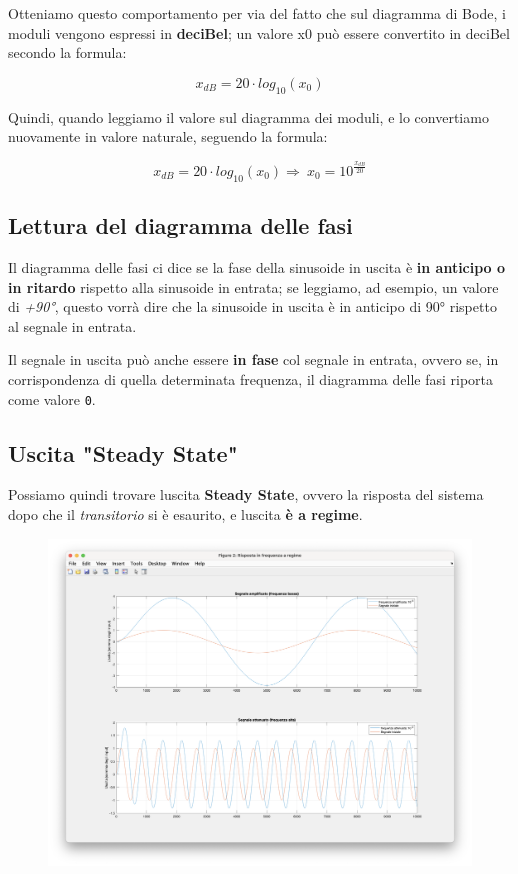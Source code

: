 \documentclass[
]{article}
\begin{document}
Otteniamo questo comportamento per via del fatto che sul diagramma di
Bode, i moduli vengono espressi in \textbf{deciBel}; un valore x0 può
essere convertito in deciBel secondo la formula:

\[x_{dB} = 20 \cdot log_{10}(x_{0})\]

Quindi, quando leggiamo il valore sul diagramma dei moduli, e lo
convertiamo nuovamente in valore naturale, seguendo la formula:

\[x_{dB} = 20 \cdot log_{10}(x_{0}) \Longrightarrow \ x_{0} = 10^{\frac{x_{dB}}{20}}\]

\hypertarget{lettura-del-diagramma-delle-fasi}{%
\subsection{Lettura del diagramma delle
fasi}\label{lettura-del-diagramma-delle-fasi}}

Il diagramma delle fasi ci dice se la fase della sinusoide in uscita è
\textbf{in anticipo o in ritardo} rispetto alla sinusoide in entrata; se
leggiamo, ad esempio, un valore di \emph{+90°}, questo vorrà dire che la
sinusoide in uscita è in anticipo di 90° rispetto al segnale in entrata.

Il segnale in uscita può anche essere \textbf{in fase} col segnale in
entrata, ovvero se, in corrispondenza di quella determinata frequenza,
il diagramma delle fasi riporta come valore \texttt{0}.

\hypertarget{uscita-steady-state}{%
\subsection{Uscita "Steady State"}\label{uscita-steady-state}}

Possiamo quindi trovare l\textquotesingle uscita \textbf{Steady State},
ovvero la risposta del sistema dopo che il \emph{transitorio} si è
esaurito, e l\textquotesingle uscita \textbf{è a regime}.

\begin{figure}
    \centering
    \includegraphics[width=0.7\linewidth]{images/image-20240107212750287.png}
    
    
\end{figure}
\end{document}
